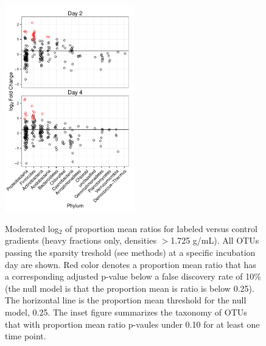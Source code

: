 \begin{figure}[H]
    \label{fig:trees}
\end{figure}

\begin{figure}[H]
  \centering
  \caption{Moderated log$_{2}$ of proportion mean ratios for labeled versus
  control gradients (heavy fractions only, densities $>$1.725 g/mL). All OTUs
  passing the sparsity treshold (see methods) at a specific incubation day are
  shown. Red color denotes a proportion mean ratio that has a corresponding
  adjusted p-value below a false discovery rate of 10\% (the null model is that
  the proportion mean is ratio is below 0.25). The horizontal line is the
  proportion mean threshold for the null model, 0.25. The inset figure
  summarizes the taxonomy of OTUs that with proportion mean ratio p-vaules
  under 0.10 for at least one time point.}
  \includegraphics[width=0.5\textwidth]{figures/l2fc/l2fc.pdf}
  \label{fig:l2fc}
\end{figure}

